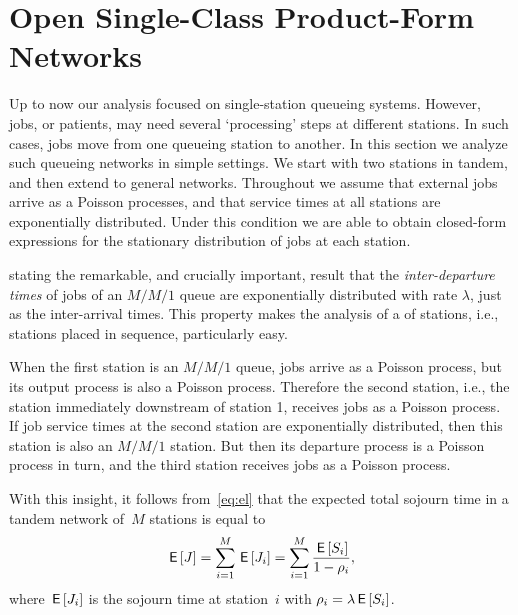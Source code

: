 \documentclass[stochastic-or.tex]{subfiles}
\begin{document}
\section{Open Single-Class Product-Form Networks}
\label{sec:jackson-networks}


Up to now our analysis focused on single-station queueing systems.
However, jobs, or patients, may need several `processing' steps at different stations.
In such cases, jobs move from one queueing station to another.
In this section we analyze such queueing networks in simple settings.
We start with two stations in tandem, and then extend to general networks.
Throughout we assume that external jobs
arrive as a Poisson processes, and that service times at all stations are exponentially distributed.
Under this condition we are able to obtain closed-form expressions for the stationary distribution of jobs at each station.




 stating the remarkable, and crucially important, result that the \emph{inter-departure times} of jobs of an $M/M/1$ queue are exponentially distributed with rate $\lambda$, just as the inter-arrival times. This property makes the analysis of a  of stations, i.e., stations placed in sequence, particularly easy.

When the first station is an $M/M/1$ queue, jobs arrive as a Poisson process, but its output process is also a Poisson process.
Therefore the second station, i.e., the station immediately downstream of station 1, receives jobs as a Poisson process.
If job service times at the second station are exponentially distributed, then this station is also an $M/M/1$ station.
But then its departure process is a Poisson process in turn, and the third station receives jobs as a Poisson process.


With this insight, it follows from~\cref{eq:el} that the expected total sojourn time in a tandem network of~$M$ stations is equal to
\begin{equation*}
  \,\mathsf{E}\left[J\right] = \sum_{i=1}^{M}\,\mathsf{E}\left[J_i\right] = \sum_{i=1}^M \frac{\,\mathsf{E}\left[S_i\right]}{1-\rho_i},
\end{equation*}
where $\,\mathsf{E}\left[J_i\right]$ is the sojourn time at station~$i$ with $\rho_i = \lambda \,\mathsf{E}\left[S_i\right]$.
\end{document}
